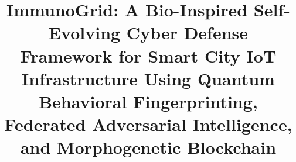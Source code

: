\documentclass[journal]{IEEEtran}
\begin{document}
\title{ImmunoGrid: A Bio-Inspired Self-Evolving Cyber Defense Framework
for Smart City IoT Infrastructure Using Quantum Behavioral Fingerprinting,
Federated Adversarial Intelligence, and Morphogenetic Blockchain}

\author{
}

\maketitle

\end{document}
